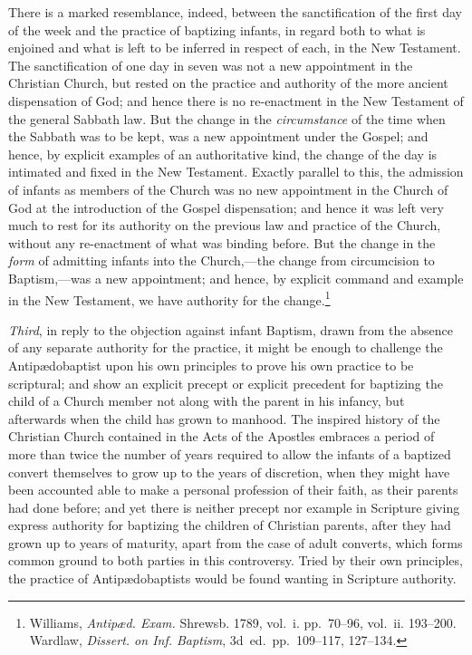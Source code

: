 \documentclass[
  english,
]{book}
\begin{document}
There is a marked resemblance, indeed, between the sanctification of the first day of the week and the practice of baptizing infants, in regard both to what is enjoined and what is left to be inferred in respect of each, in the New Testament. The sanctification of one day in seven was not a new appointment in the Christian Church, but rested on the practice and authority of the more ancient dispensation of God; and hence there is no re-enactment in the New Testament of the general Sabbath law. But the change in the \emph{circumstance} of the time when the Sabbath was to be kept, was a new appointment under the Gospel; and hence, by explicit examples of an authoritative kind, the change of the day is intimated and fixed in the New Testament. Exactly parallel to this, the admission of infants as members of the Church was no new appointment in the Church of God at the introduction of the Gospel dispensation; and hence it was left very much to rest for its authority on the previous law and practice of the Church, without any re-enactment of what was binding before. But the change in the \emph{form} of admitting infants into the Church,---the change from circumcision to Baptism,---was a new appointment; and hence, by explicit command and example in the New Testament, we have authority for the change.\footnote{Williams, \emph{Antipæd. Exam.} Shrewsb. 1789, vol.~i. pp.~70--96, vol.~ii. 193--200. Wardlaw, \emph{Dissert. on Inf. Baptism}, 3d~ed.~pp.~109--117, 127--134.}

\emph{Third}, in reply to the objection against infant Baptism, drawn from the absence of any separate authority for the practice, it might be enough to challenge the Antipædobaptist upon his own principles to prove his own practice to be scriptural; and show an explicit precept or explicit precedent for baptizing the child of a Church member not along with the parent in his infancy, but afterwards when the child has grown to manhood. The inspired history of the Christian Church contained in the Acts of the Apostles embraces a period of more than twice the number of years required to allow the infants of a baptized convert themselves to grow up to the years of discretion, when they might have been accounted able to make a personal profession of their faith, as their parents had done before; and yet there is neither precept nor example in Scripture giving express authority for baptizing the children of Christian parents, after they had grown up to years of maturity, apart from the case of adult converts, which forms common ground to both parties in this controversy. Tried by their own principles, the practice of Antipædobaptists would be found wanting in Scripture authority.
\end{document}
